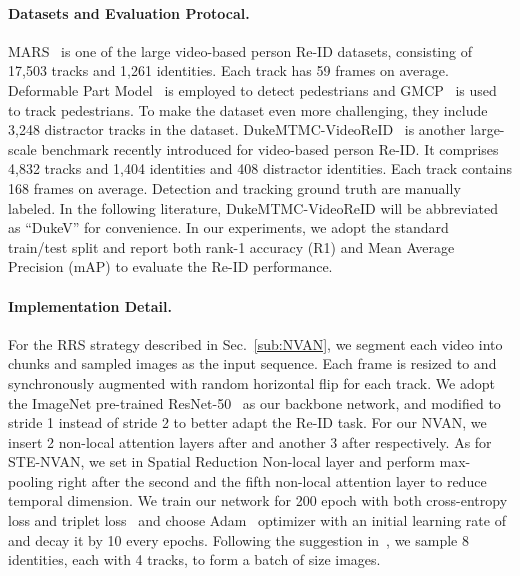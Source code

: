 \documentclass{bmvc2k}
\begin{document}
\paragraph{Datasets and Evaluation Protocal.} MARS~\cite{mars} is one of the large video-based person Re-ID datasets, consisting of 17,503 tracks and 1,261 identities.  Each track has 59 frames on average.
Deformable Part Model~\cite{dpm} is employed to detect pedestrians and GMCP~\cite{gmcp} is used to track pedestrians.
To make the dataset even more challenging, they include 3,248 distractor tracks in the dataset.
DukeMTMC-VideoReID~\cite{dukevideo} is another large-scale benchmark recently introduced for video-based person Re-ID. It comprises 4,832 tracks and 1,404 identities and 408 distractor identities.
Each track contains 168 frames on average. 
Detection and tracking ground truth are manually labeled.
In the following literature, DukeMTMC-VideoReID will be abbreviated as ``DukeV'' for convenience. 
In our experiments, we adopt the standard train/test split and report both rank-1 accuracy (R1) and Mean Average Precision (mAP) to evaluate the Re-ID performance. 


\vspace{-3mm}
\paragraph{Implementation Detail.}
For the RRS strategy described in Sec.~\ref{sub:NVAN}, we segment each video into  chunks and sampled  images as the input sequence. 
Each frame is resized to  and synchronously augmented with random horizontal flip for each track. 
We adopt the ImageNet pre-trained ResNet-50~\cite{resnet} as our backbone network, and modified  to stride 1 instead of stride 2 to better adapt the Re-ID task.
For our NVAN, we insert 2 non-local attention layers after  and another 3 after  respectively. 
As for STE-NVAN, we set  in Spatial Reduction Non-local layer and perform max-pooling right after the second and the fifth non-local attention layer to reduce temporal dimension.
We train our network for 200 epoch with both cross-entropy loss and triplet loss~\cite{trip} and choose Adam~\cite{adam} optimizer with an initial learning rate of  and decay it by 10 every  epochs.
Following the suggestion in~\cite{trip}, we sample 8 identities, each with 4 tracks, to form a batch of size  images.
\end{document}
